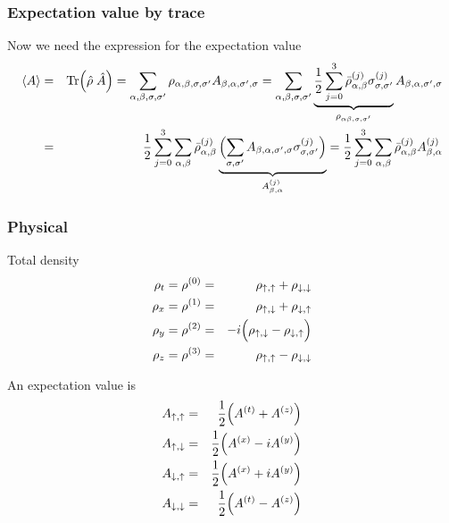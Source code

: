 \documentclass[11pt,a4paper]{report}
\begin{document}
\subsubsection{Expectation value by trace}

Now we need the expression for the expectation value
\begin{eqnarray*}
\langle{A}\rangle
&=&\mathrm{Tr}\Bigl(\hat{\rho}\;\hat{A}\Bigr)
=
\sum_{\alpha,\beta,\sigma,\sigma'}
\rho_{\alpha,\beta,\sigma,\sigma'} A_{\beta,\alpha,\sigma',\sigma}
=\sum_{\alpha,\beta,\sigma,\sigma'}
\underbrace{\frac{1}{2}\sum_{j=0}^3 
\bar{\rho}^{(j)}_{\alpha,\beta}
\sigma^{(j)}_{\sigma,\sigma'}}
_{\rho_{\alpha\beta,\sigma,\sigma'}} A_{\beta,\alpha,\sigma',\sigma}
\nonumber\\
&=&\frac{1}{2}
\sum_{j=0}^3 
\sum_{\alpha,\beta}
\bar{\rho}^{(j)}_{\alpha,\beta}
\underbrace{
\Bigl(
\sum_{\sigma,\sigma'}
A_{\beta,\alpha,\sigma',\sigma}\sigma^{(j)}_{\sigma,\sigma'}\Bigr)}
_{A^{(j)}_{\beta,\alpha}}
=\frac{1}{2}
\sum_{j=0}^3 
\sum_{\alpha,\beta}
\bar{\rho}^{(j)}_{\alpha,\beta}A^{(j)}_{\beta,\alpha}
\end{eqnarray*}

\subsubsection{Physical}
Total density
\begin{eqnarray}
\rho_t=\rho^{(0)}&=&\rho_{\uparrow,\uparrow}+\rho_{\downarrow,\downarrow}
\\
\rho_x=\rho^{(1)}&=&\rho_{\uparrow,\downarrow}+\rho_{\downarrow,\uparrow}
\\
\rho_y=\rho^{(2)}&=&-i\Bigl(\rho_{\uparrow,\downarrow}-\rho_{\downarrow,\uparrow}\Bigr)
\\
\rho_z=\rho^{(3)}&=&\rho_{\uparrow,\uparrow}-\rho_{\downarrow,\downarrow}
\end{eqnarray}

An expectation value is
\begin{eqnarray}
A_{\uparrow,\uparrow}&=&\frac{1}{2}\Bigl(A^{(t)}+A^{(z)}\Bigr)
\nonumber\\
A_{\uparrow,\downarrow}&=&\frac{1}{2}\Bigl(A^{(x)}-iA^{(y)}\Bigr)
\nonumber\\
A_{\downarrow,\uparrow}&=&\frac{1}{2}\Bigl(A^{(x)}+iA^{(y)}\Bigr)
\nonumber\\
A_{\downarrow,\downarrow}&=&\frac{1}{2}\Bigl(A^{(t)}-A^{(z)}\Bigr)
\end{eqnarray}
\end{document}

